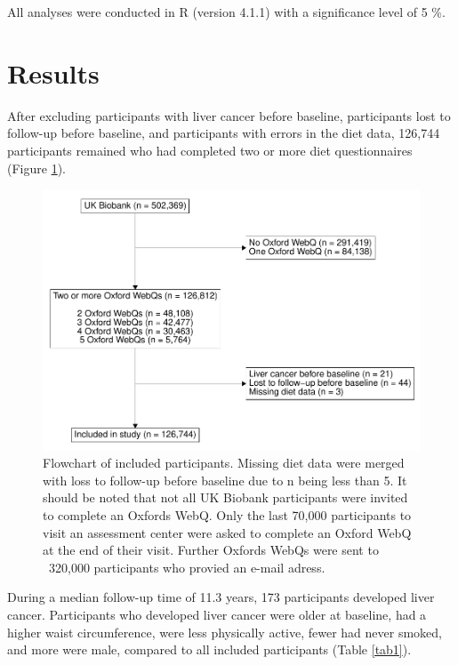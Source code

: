 \documentclass[sn-basic,Numbered,iicol,pdflatex]{sn-jnl}
\begin{document}
All analyses were conducted in R (version 4.1.1) with a significance
level of 5 \%.

\hypertarget{sec3}{%
\section{Results}\label{sec3}}

After excluding participants with liver cancer before baseline,
participants lost to follow-up before baseline, and participants with
errors in the diet data, 126,744 participants remained who had completed
two or more diet questionnaires (Figure \ref{fig:fig1}).

\begin{figure}
\includegraphics[width=1\linewidth,]{legliv_eur-j-nutr_files/figure-latex/fig1-1} \caption{Flowchart of included participants. Missing diet data were merged with loss to follow-up before baseline due to n being less than 5. It should be noted that not all UK Biobank participants were invited to complete an Oxfords WebQ. Only the last 70,000 participants to visit an assessment center were asked to complete an Oxford WebQ at the end of their visit. Further Oxfords WebQs were sent to ~320,000 participants who provied an e-mail adress.}\label{fig:fig1}
\end{figure}

During a median follow-up time of 11.3 years, 173 participants developed
liver cancer. Participants who developed liver cancer were older at
baseline, had a higher waist circumference, were less physically active,
fewer had never smoked, and more were male, compared to all included
participants (Table \ref{tab1}).
\end{document}

